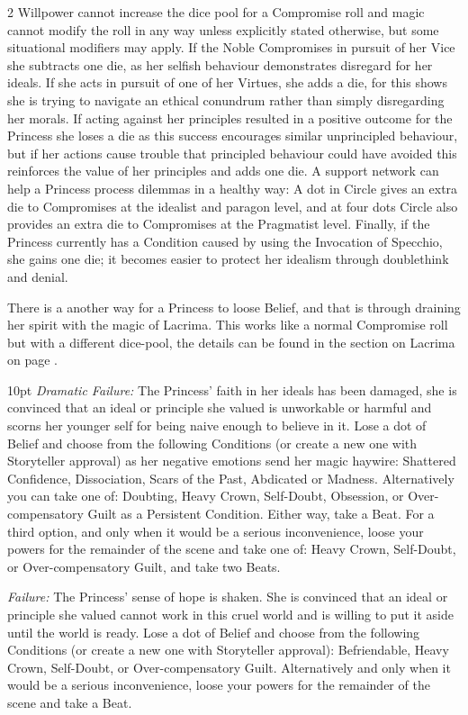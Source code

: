 \begin{multicols}{2}
Willpower cannot increase the dice pool for a Compromise roll and magic cannot modify the roll in any way unless explicitly stated otherwise, but some situational modifiers may apply. If the Noble Compromises in pursuit of her Vice she subtracts one die, as her selfish behaviour demonstrates disregard for her ideals. If she acts in pursuit of one of her Virtues, she adds a die, for this shows she is trying to navigate an ethical conundrum rather than simply disregarding her morals. If acting against her principles resulted in a positive outcome for the Princess she loses a die as this success encourages similar unprincipled behaviour, but if her actions cause trouble that principled behaviour could have avoided this reinforces the value of her principles and adds one die. A support network can help a Princess process dilemmas in a healthy way: A dot in Circle gives an extra die to Compromises at the idealist and paragon level, and at four dots Circle also provides an extra die to Compromises at the Pragmatist level. Finally, if the Princess currently has a Condition caused by using the Invocation of Specchio, she gains one die; it becomes easier to protect her idealism through doublethink and denial. 

There is a another way for a Princess to loose Belief, and that is through draining her spirit with the magic of Lacrima. This works like a normal Compromise roll but with a different dice-pool, the details can be found in the section on Lacrima on page \pageref{LacrimaRef}. 

\begin{myindentpar}{10pt}
\emph{Dramatic Failure:} The Princess' faith in her ideals has been damaged, she is convinced that an ideal or principle she valued is unworkable or harmful and scorns her younger self for being naive enough to believe in it. Lose a dot of Belief and choose from the following Conditions  (or create a new one with Storyteller approval) as her negative emotions send her magic haywire: Shattered Confidence, Dissociation, Scars of the Past, Abdicated or Madness. Alternatively you can take one of: Doubting, Heavy Crown, Self-Doubt, Obsession, or Over-compensatory Guilt as a Persistent Condition. Either way, take a Beat. For a third option, and only when it would be a serious inconvenience, loose your powers for the remainder of the scene and take one of: Heavy Crown, Self-Doubt, or Over-compensatory Guilt, and take two Beats. 

\emph{Failure:} The Princess' sense of hope is shaken. She is convinced that an ideal or principle she valued cannot work in this cruel world and is willing to put it aside until the world is ready. Lose a dot of Belief and choose from the following Conditions (or create a new one with Storyteller approval): Befriendable, Heavy Crown, Self-Doubt, or Over-compensatory Guilt. Alternatively and only when it would be a serious inconvenience, loose your powers for the remainder of the scene and take a Beat. 


\end{myindentpar}
\end{multicols}

